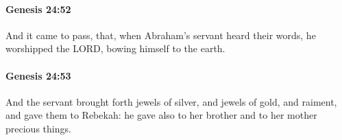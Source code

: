 		\paragraph{Genesis 24:52} %
			\label{GENESIS-24-52}

			And it came to pass, that, when Abraham's servant heard their words, he worshipped the LORD, bowing himself to the earth.


		\paragraph{Genesis 24:53} %
			\label{GENESIS-24-53}

			And the servant brought forth jewels of silver, and jewels of gold, and raiment, and gave them to Rebekah: he gave also to her brother and to her mother precious things.


